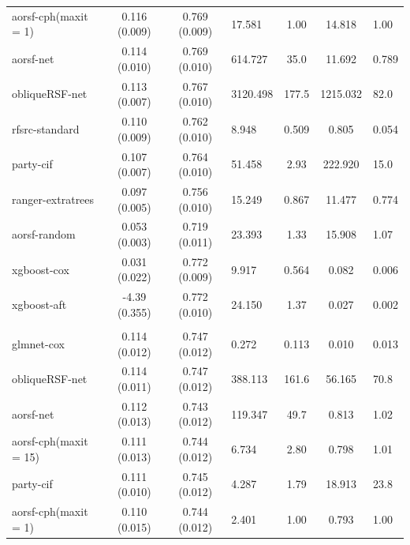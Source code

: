 \documentclass[twoside,11pt]{article}\usepackage[]{graphicx}\usepackage[]{color}
\newenvironment{knitrout}{}{} %
\begin{document}
\begin{knitrout}
\begin{longtable}{lcclccl}
\hspace{1em}aorsf-cph(maxit = 1) & 0.116 (0.009) & 0.769 (0.009) & 17.581 & 1.00 & 14.818 & 1.00\\
\hspace{1em}aorsf-net & 0.114 (0.010) & 0.769 (0.010) & 614.727 & 35.0 & 11.692 & 0.789\\
\hspace{1em}obliqueRSF-net & 0.113 (0.007) & 0.767 (0.010) & 3120.498 & 177.5 & 1215.032 & 82.0\\
\hspace{1em}rfsrc-standard & 0.110 (0.009) & 0.762 (0.010) & 8.948 & 0.509 & 0.805 & 0.054\\
\hspace{1em}party-cif & 0.107 (0.007) & 0.764 (0.010) & 51.458 & 2.93 & 222.920 & 15.0\\
\hspace{1em}ranger-extratrees & 0.097 (0.005) & 0.756 (0.010) & 15.249 & 0.867 & 11.477 & 0.774\\
\hspace{1em}aorsf-random & 0.053 (0.003) & 0.719 (0.011) & 23.393 & 1.33 & 15.908 & 1.07\\
\hspace{1em}xgboost-cox & 0.031 (0.022) & 0.772 (0.009) & 9.917 & 0.564 & 0.082 & 0.006\\
\hspace{1em}xgboost-aft & -4.39 (0.355) & 0.772 (0.010) & 24.150 & 1.37 & 0.027 & 0.002\\
\addlinespace[0.3em]
\hline
\multicolumn{7}{l}{\textit{\textbf{Systolic Heart Failure; death, n = 2231, p = 41}}}\\
\hline
\hspace{1em}glmnet-cox & 0.114 (0.012) & 0.747 (0.012) & 0.272 & 0.113 & 0.010 & 0.013\\
\hspace{1em}obliqueRSF-net & 0.114 (0.011) & 0.747 (0.012) & 388.113 & 161.6 & 56.165 & 70.8\\
\hspace{1em}aorsf-net & 0.112 (0.013) & 0.743 (0.012) & 119.347 & 49.7 & 0.813 & 1.02\\
\hspace{1em}aorsf-cph(maxit = 15) & 0.111 (0.013) & 0.744 (0.012) & 6.734 & 2.80 & 0.798 & 1.01\\
\hspace{1em}party-cif & 0.111 (0.010) & 0.745 (0.012) & 4.287 & 1.79 & 18.913 & 23.8\\
\hspace{1em}aorsf-cph(maxit = 1) & 0.110 (0.015) & 0.744 (0.012) & 2.401 & 1.00 & 0.793 & 1.00\\

\end{longtable}
\end{knitrout}
\end{document}
